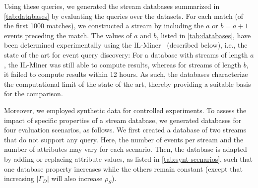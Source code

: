 Using these queries, we generated the stream databases summarized in
\autoref{tab:databases} by evaluating the queries over the
datasets. For each match (of the first 1000 matches), we constructed a
stream by including the $a$ or
$b=a+1$ events preceding the match. The values of $a$ and $b$, listed in
\autoref{tab:databases}, have been determined experimentally using the
IL-Miner~\cite{ilminer} (described below), i.e., the state of the art for
event query discovery: For a database with streams of length $a$, the
IL-Miner was still
able to compute results, whereas for streams of length $b$, it failed to
compute results within 12 hours. As such, the databases characterize the
computational limit of the state of the art, thereby providing a suitable
basis for the comparison.

Moreover, we employed synthetic data for controlled experiments.
 To assess the impact of specific properties of a
stream database, we generated databases for four evaluation scenarios, as
follows. We first created a database
of two streams that do not support any query. Here, the number of events per
stream and the number of attributes may vary for each scenario. Then, the
database is adapted by adding or replacing attribute values, as listed in
\autoref{tab:synt-scenarios}, such that one
database property increases while the others remain constant (except that
increasing $|\Gamma_D|$ will also increase $\rho_S$).

